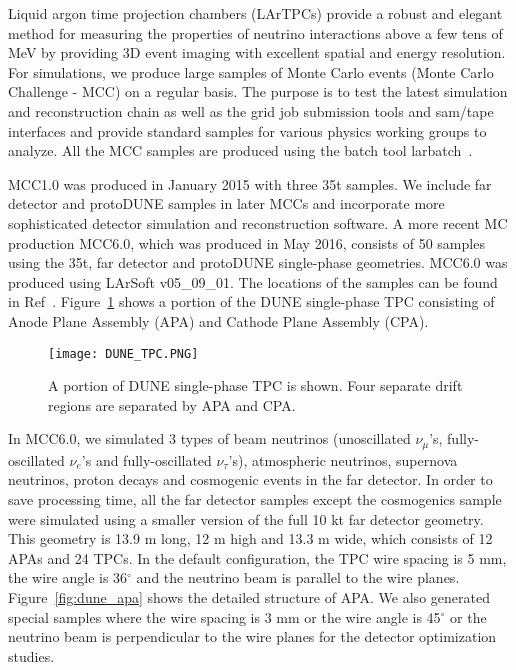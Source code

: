 Liquid argon time projection chambers (LArTPCs) provide a robust and elegant method for measuring the properties of neutrino interactions above a few tens of MeV by providing 3D event imaging with excellent spatial and energy resolution. For simulations, we produce large samples of Monte Carlo events (Monte Carlo Challenge - MCC) on a regular basis. The purpose is to test the latest simulation and reconstruction chain as well as the grid job submission tools and sam/tape interfaces and provide standard samples for various physics working groups to analyze. All the MCC samples are produced using the batch tool larbatch~\cite{ref:larbatch}.

MCC1.0 was produced in January 2015 with three 35t samples. We include far detector and protoDUNE samples in later MCCs and incorporate more sophisticated detector simulation and reconstruction software. A more recent MC production MCC6.0, which was produced in May 2016, consists of 50 samples using the 35t, far detector and protoDUNE single-phase geometries. MCC6.0 was produced using LArSoft v05\_09\_01. The locations of the samples can be found in Ref~\cite{ref:mcc6}. Figure~\ref{fig:dune_tpc} shows a portion of the DUNE single-phase TPC consisting of Anode Plane Assembly (APA) and Cathode Plane Assembly (CPA).

\begin{figure}[!ht]
\centering
\texttt{[image: DUNE\_TPC.PNG]}
\caption{A portion of DUNE single-phase TPC is shown. Four separate drift regions are separated by APA and CPA. }
\label{fig:dune_tpc}
\end{figure}

In MCC6.0, we simulated 3 types of beam neutrinos (unoscillated $\nu_\mu$'s, fully-oscillated $\nu_{e}$'s and fully-oscillated $\nu_\tau$'s), atmospheric neutrinos, supernova neutrinos, proton decays and cosmogenic events in the far detector. In order to save processing time, all the far detector samples except the cosmogenics sample were simulated using a smaller version of the full 10 kt far detector geometry. This geometry is 13.9 m long, 12 m high and 13.3 m wide, which consists of 12 APAs and 24 TPCs. In the default configuration, the TPC wire spacing is 5 mm, the wire angle is 36$^{\circ}$ and the neutrino beam is parallel to the wire planes. Figure~\ref{fig:dune_apa} shows the detailed structure of APA. We also generated special samples where the wire spacing is 3 mm or the wire angle is 45$^{\circ}$ or the neutrino beam is perpendicular to the wire planes for the detector optimization studies. 

